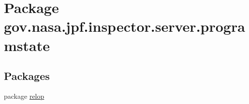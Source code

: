 \hypertarget{namespacegov_1_1nasa_1_1jpf_1_1inspector_1_1server_1_1programstate}{}\section{Package gov.\+nasa.\+jpf.\+inspector.\+server.\+programstate}
\label{namespacegov_1_1nasa_1_1jpf_1_1inspector_1_1server_1_1programstate}
\subsection*{Packages}
\begin{DoxyCompactItemize}
\item 
package \hyperlink{namespacegov_1_1nasa_1_1jpf_1_1inspector_1_1server_1_1programstate_1_1relop}{relop}
\end{DoxyCompactItemize}
